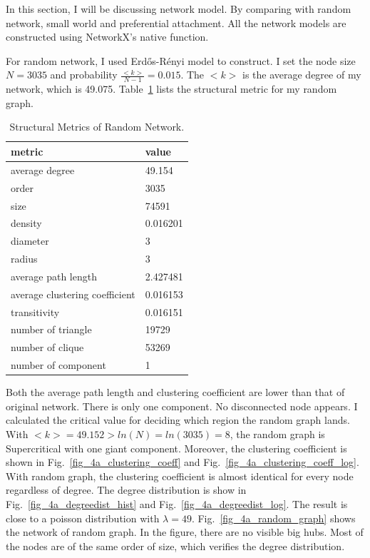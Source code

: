 \documentclass[runningheads]{llncs}
\begin{document}
In this section, I will be discussing network model. By comparing with random network, small world  and preferential attachment. All the network models are constructed using NetworkX's native function.

For random network, I used Erdős-Rényi model to construct. I set the node size \(N = 3035\) and probability \( \frac{<k>}{N-1} =0.015 \). The \( <k> \) is the average degree of my network, which is 49.075. Table~\ref{tab_random} lists the structural metric for my random graph.

\begin{table}
\centering
\caption{Structural Metrics of Random Network.}\label{tab_random}
\begin{tabular}{|l|l|}
\hline
metric & value \\
\hline
average degree & 49.154 \\
order & 3035 \\
size & 74591 \\
density & 0.016201 \\
diameter & 3 \\
radius & 3 \\
average path length & 2.427481 \\
average clustering coefficient & 0.016153 \\
transitivity & 0.016151 \\
number of triangle & 19729 \\
number of clique & 53269 \\
number of component & 1 \\
\hline
\end{tabular}
\end{table}

Both the average path length and clustering coefficient are lower than that of original network. There is only one component. No disconnected node appears. I calculated the critical value for deciding which region the random graph lands. With \(<k> = 49.152 > ln(N) = ln(3035) = 8\), the random graph is Supercritical with one giant component. Moreover, the clustering coefficient is shown in Fig.~\ref{fig_4a_clustering_coeff} and  Fig.~\ref{fig_4a_clustering_coeff_log}. With random graph, the clustering coefficient is almost identical for every node regardless of degree. The degree distribution is show in Fig.~\ref{fig_4a_degreedist_hist} and  Fig.~\ref{fig_4a_degreedist_log}. The result is close to a poisson distribution with \( \lambda = 49 \). Fig.~\ref{fig_4a_random_graph} shows the network of random graph. In the figure, there are no visible big hubs. Most of the nodes are of the same order of size, which verifies the degree distribution. 
\end{document}

